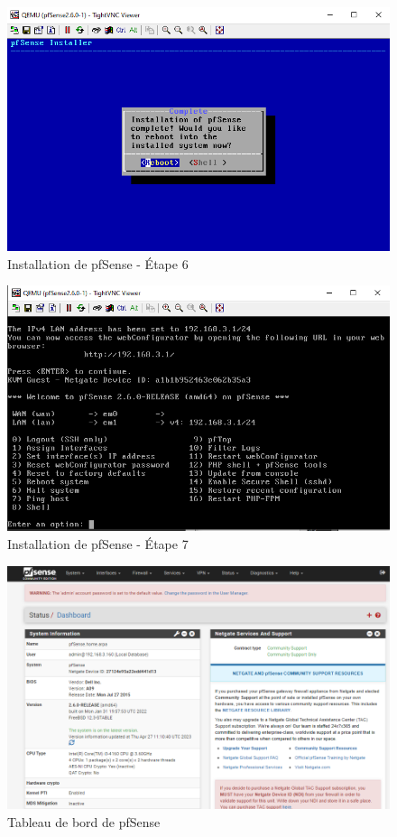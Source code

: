 \begin{figure}[H]
\centering
\includegraphics[width=15cm]{Images/BRadesMelian-Topologie7.png}
\caption{Installation de pfSense - Étape 6}
\label{Chap3.3.7}
\end{figure}

\begin{figure}[H]
\centering
\includegraphics[width=15cm]{Images/BRadesMelian-Topologie8.png}
\caption{Installation de pfSense - Étape 7}
\label{Chap3.3.8}
\end{figure}

\begin{figure}[H]
\centering
\includegraphics[width=15cm]{Images/BRadesMelian-Topologie14.png}
\caption{Tableau de bord de pfSense}
\label{Chap3.3.9}
\end{figure}

